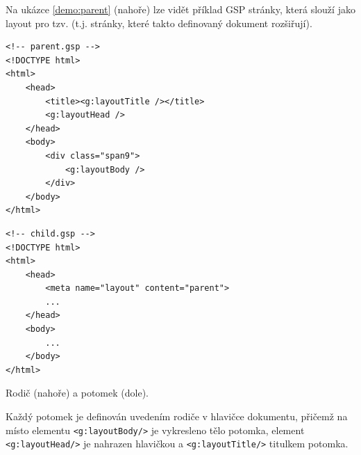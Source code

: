 Na ukázce \ref{demo:parent} (nahoře) lze vidět příklad GSP stránky, která slouží jako layout pro tzv.  (t.j. stránky, které takto definovaný dokument rozšiřují).

\begin{demo}
    \centering
    \begin{lstlisting}[language=html5]
<!-- parent.gsp -->
<!DOCTYPE html>
<html>
    <head>
        <title><g:layoutTitle /></title>
        <g:layoutHead />
    </head>
    <body>
        <div class="span9">
            <g:layoutBody />
        </div>
    </body>
</html>
    \end{lstlisting}
    \begin{lstlisting}[language=html5]
<!-- child.gsp -->
<!DOCTYPE html>
<html>
    <head>
        <meta name="layout" content="parent">
        ...
    </head>
    <body>
        ...
    </body>
</html>
    \end{lstlisting}
    \caption{Rodič (nahoře) a potomek (dole).}
    \label{demo:parent}
\end{demo}

Každý potomek je definován uvedením rodiče v hlavičce dokumentu, přičemž na místo elementu \texttt{<g:layoutBody/>} je vykresleno tělo potomka, element \texttt{<g:layoutHead/>} je nahrazen hlavičkou a \texttt{<g:layoutTitle/>} titulkem potomka.
